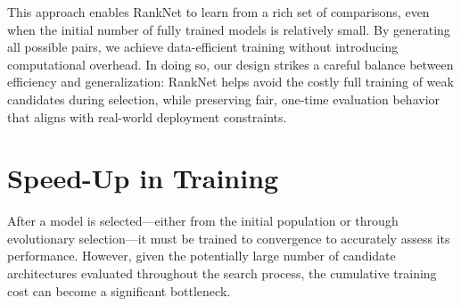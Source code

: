 This approach enables RankNet to learn from a rich set of comparisons, even when the initial number of fully trained models is relatively small. By generating all possible pairs, we achieve data-efficient training without introducing computational overhead. In doing so, our design strikes a careful balance between efficiency and generalization: RankNet helps avoid the costly full training of weak candidates during selection, while preserving fair, one-time evaluation behavior that aligns with real-world deployment constraints.

\section{Speed-Up in Training}

After a model is selected—either from the initial population or through evolutionary selection—it must be trained to convergence to accurately assess its performance. However, given the potentially large number of candidate architectures evaluated throughout the search process, the cumulative training cost can become a significant bottleneck.

